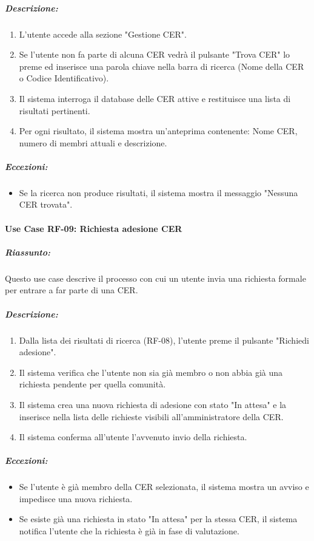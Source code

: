 \subparagraph*{Descrizione:}
\begin{enumerate}
    \item L’utente accede alla sezione "Gestione CER".
    \item Se l'utente non fa parte di alcuna CER vedrà il pulsante "Trova CER" lo preme ed inserisce una parola chiave nella barra di ricerca (Nome della CER o Codice Identificativo).
    \item Il sistema interroga il database delle CER attive e restituisce una lista di risultati pertinenti.
    \item Per ogni risultato, il sistema mostra un'anteprima contenente: Nome CER, numero di membri attuali e descrizione.
\end{enumerate}

\subparagraph*{Eccezioni:}
\begin{itemize}
    \item Se la ricerca non produce risultati, il sistema mostra il messaggio "Nessuna CER trovata".
\end{itemize}


\paragraph*{Use Case RF-09: Richiesta adesione CER}
\subparagraph*{Riassunto:}
Questo use case descrive il processo con cui un utente invia una richiesta formale per entrare a far parte di una CER.

\subparagraph*{Descrizione:}
\begin{enumerate}
    \item Dalla lista dei risultati di ricerca (RF-08), l'utente preme il pulsante "Richiedi adesione".
    \item Il sistema verifica che l'utente non sia già membro o non abbia già una richiesta pendente per quella comunità.
    \item Il sistema crea una nuova richiesta di adesione con stato "In attesa" e la inserisce nella lista delle richieste visibili all'amministratore della CER.
    \item Il sistema conferma all'utente l'avvenuto invio della richiesta.
\end{enumerate}

\subparagraph*{Eccezioni:}
\begin{itemize}
    \item Se l'utente è già membro della CER selezionata, il sistema mostra un avviso e impedisce una nuova richiesta.
    \item Se esiste già una richiesta in stato "In attesa" per la stessa CER, il sistema notifica l'utente che la richiesta è già in fase di valutazione.
\end{itemize}


